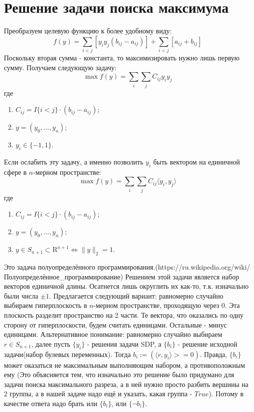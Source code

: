 \documentclass[12pt]{article}
\begin{document}
\section{Решение задачи поиска максимума}
Преобразуем целевую функцию к более удобному виду:
$$
f(y) = \sum_{i < j} \left[ y_i y_j (b_{ij} - a_{ij}) \right] + \sum_{i < j}\left[ a_{ij} + b_{ij} \right]
$$
Поскольку вторая сумма - константа, то максимизировать нужно лишь первую сумму.
Получаем следующую задачу:
$$
\max f(y) = \sum_{i} \sum_{j} C_{ij} y_i y_j
$$
где
\begin{enumerate}
    \item $C_{ij} = I\{i < j\} \cdot (b_{ij} - a_{ij})$;
    \item $y = (y_0, \dots, y_n)$;
    \item $y_i \in \{-1, 1\}$.
\end{enumerate}
Если ослабить эту задачу, а именно позволить $y_i$ быть вектором на единичной сфере в $n$-мерном пространстве:
$$
\max f(y) = \sum_{i} \sum_{j} C_{ij} \langle y_i, y_j \rangle
$$
где
\begin{enumerate}
    \item $C_{ij} = I\{i < j\} \cdot (b_{ij} - a_{ij})$;
    \item $y = (y_0, \dots, y_n)$;
    \item $y \in S_{n + 1} \subset \mathrm{R}^{n + 1} \Longleftrightarrow \|y \|_2 = 1$.
\end{enumerate}
Это задача полуопределённого программирования.\newline (https://ru.wikipedia.org/wiki/Полуопределённое\_программирование)\newline
Решением этой задачи является набор векторов единичной длины. Осатнется лишь округлить их как-то, т.к. изначально были числа $\pm 1$. Предлагается следующий вариант: равномерно случайно выбираем гиперплоскость в $n$-мерном пространстве, проходящую через 0. Эта плоскость разделит пространство на 2 части. Те вектора, что оказались по одну сторону от гиперплоскости, будем считать единицами. Остальные - минус единицами. \newline
Альтернативное понимание: равномерно случайно выбираем $r \in S_{n + 1}$, далее пусть $\{y_i\}$ -  решения задачи SDP, а $\{b_i\}$ - решение исходной задачи(набор булевых переменных). Тогда $b_i := (\langle r, y_i \rangle >= 0)$. Правда, $\{b_i\}$ может оказаться не максимальным выполняющим набором, а противоположным ему (Это объясняется тем, что изначально это решение было придумано для задачи поиска максимального разреза, а в ней нужно просто разбить вершины на 2 группы, а в нашей задаче надо ещё и указать, какая группа - $True$). Потому в качестве ответа надо брать или $\{b_i\}$, или $\{\lnot b_i\}$.
\end{document}
